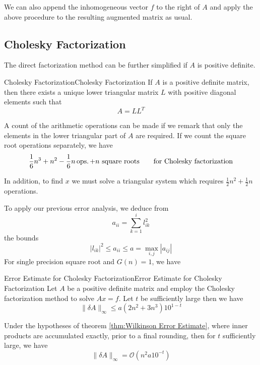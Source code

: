 \documentclass[../main.tex]{subfiles}
\begin{document}
We can also append the inhomogeneous vector $f$ to the right of $A$ and apply the above procedure to the resulting augmented matrix as usual.

\subsection{Cholesky Factorization}

The direct factorization method can be further simplified if $A$ is positive definite.
\begin{theorem}{Cholesky Factorization}{Cholesky Factorization}
	If $A$ is a positive definite matrix, then there exists a unique lower triangular matrix $L$ with positive diagonal elements such that
	\begin{equation*}
		A = L L^T
	\end{equation*}
\end{theorem}
A count of the arithmetic operations can be made if we remark that only the elements in the lower triangular part of $A$ are required. If we count the square root operations separately, we have
\begin{equation*}
	\frac{1}{6} n^3 + n^2 - \frac{1}{6} n \operatorname{ops.} + n \text{ square roots} \qquad \text{for Cholesky factorization}
\end{equation*}

In addition, to find $x$ we must solve a triangular system which requires $\frac{1}{2} n^2 + \frac{1}{2} n$ operations.

To apply our previous error analysis, we deduce from
\begin{equation*}
	a_{ii} = \sum_{k=1}^i l_{ik}^2
\end{equation*}
the bounds
\begin{equation*}
	| l_{ik} |^2 \leq a_{ii} \leq a = \max_{i,j} | a_{ij} |
\end{equation*}
For single precision square root and $G(n) = 1$, we have
\begin{theorem}{Error Estimate for Cholesky Factorization}{Error Estimate for Cholesky Factorization}
	Let $A$ be a positive definite matrix and employ the Cholesky factorization method to solve $A x = f$. Let $t$ be sufficiently large then we have
	\begin{equation}
		\| \delta A \|_{\infty} \leq a (2n^2 + 3n^3) 10^{1-t}
	\end{equation}

	Under the hypotheses of theorem \ref{thm:Wilkinson Error Estimate}, where inner products are accumulated exactly, prior to a final rounding, then for $t$ sufficiently large, we have
	\begin{equation}
		\| \delta A \|_{\infty} = \mathcal{O}(n^2 a 10^{-t})
	\end{equation}
\end{theorem}
\end{document}
